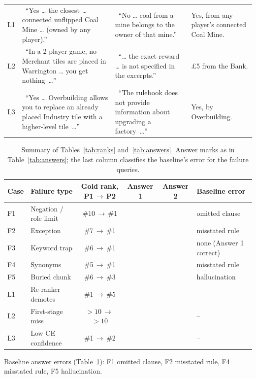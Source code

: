 \documentclass[10pt,a4paper]{article}
\newcommand{\ra}{\,$\rightarrow$\,}
\newcommand{\ok}{\ding{51}}           %
\newcommand{\no}{\ding{55}}           %
\newcommand{\pmark}{\ding{119}}       %
\newcommand{\abst}{\ding{109}}        %
\begin{document}
\begin{table}[H]
\begin{tabularx}{\textwidth}{@{}l
  >{\raggedright\arraybackslash}X
  >{\raggedright\arraybackslash}X
  >{\raggedright\arraybackslash}p{3.3cm}@{}}
\midrule
L1 & \ok~\enquote{Yes \dots{} the closest \dots{} connected unflipped Coal Mine \dots{} (owned by any player).}
   & \no~\enquote{No \dots{} coal from a mine belongs to the owner of that mine.}
   & Yes, from any player's connected Coal Mine. \\
L2 & \no~\enquote{In a 2-player game, no Merchant tiles are placed in Warrington \dots{} you get nothing~\dots}
   & \abst~\enquote{\dots{} the exact reward \dots{} is not specified in the excerpts.}
   & \pounds 5 from the Bank. \\
L3 & \ok~\enquote{Yes \dots{} Overbuilding allows you to replace an already placed Industry tile with a higher-level tile~\dots}
   & \abst~\enquote{The rulebook does not provide information about upgrading a factory~\dots}
   & Yes, by Overbuilding. \\
\bottomrule
\end{tabularx}
\end{table}

\begin{table}[H]
\centering\footnotesize
\caption{Summary of Tables~\ref{tab:ranks} and~\ref{tab:answers}. Answer marks as in Table~\ref{tab:answers};
the last column classifies the baseline's error for the failure queries.}
\label{tab:summary}
\begin{tabular}{@{}llcccl@{}}
\toprule
Case & Failure type & Gold rank, P1\ra P2 & Answer 1 & Answer 2 & Baseline error \\
\midrule
F1 & Negation / role limit & \#10\ra\#1 & \abst & \ok & omitted clause \\
F2 & Exception             & \#7\ra\#1  & \no   & \ok & misstated rule \\
F3 & Keyword trap          & \#6\ra\#1  & \ok   & \no & none (Answer 1 correct) \\
F4 & Synonyms              & \#5\ra\#1  & \pmark & \ok & misstated rule \\
F5 & Buried chunk          & \#6\ra\#3  & \no   & \ok & hallucination \\
\midrule
L1 & Re-ranker demotes     & \#1\ra\#5  & \ok   & \no   & -- \\
L2 & First-stage miss      & ${>}10$\ra${>}10$ & \no & \abst & -- \\
L3 & Low CE confidence     & \#1\ra\#2  & \ok   & \abst & -- \\
\bottomrule
\end{tabular}
\end{table}

Baseline answer errors (Table~\ref{tab:summary}): F1 omitted clause, F2 misstated rule, F4 misstated rule,
F5 hallucination.
\end{document}
